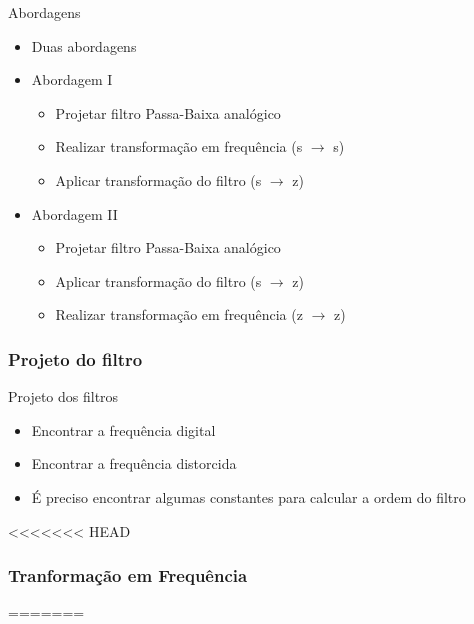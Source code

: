 \documentclass{beamer}
\begin{document}
	\begin{frame}{Abordagens}
		\begin{itemize}
			\item Duas abordagens
		\end{itemize}
		\begin{itemize}
			\item  Abordagem I
				\begin{itemize}
					\item Projetar filtro Passa-Baixa anal\'ogico
					\item Realizar transforma\c{c}\~ao em frequ\^encia (s \(\rightarrow\) s)
					\item Aplicar transforma\c{c}\~ao do filtro (s \(\rightarrow\) z)
				\end{itemize}
	\end{itemize}
		\begin{itemize}
			\item Abordagem II
				\begin{itemize}
					\item Projetar filtro Passa-Baixa anal\'ogico
					\item Aplicar transforma\c{c}\~ao do filtro (s \(\rightarrow\) z)
					\item Realizar transforma\c{c}\~ao em frequ\^encia (z \(\rightarrow\) z)
				\end{itemize}
		\end{itemize}
	\end{frame}

\subsubsection{Projeto do filtro}
	\begin{frame}{Projeto dos filtros}
		\begin{itemize}
		 \item Encontrar a frequ\^encia digital \omega
		\end{itemize}
		\begin{itemize}
		 \item Encontrar a frequ\^encia distorcida \Omega
		\end{itemize}
		\begin{itemize}
		 \item \'E preciso encontrar algumas constantes para calcular a ordem do filtro
		\end{itemize}
	\end{frame}
	
<<<<<<< HEAD
\subsubsection{Tranforma\c{c}\~ao em Frequ\^encia}
=======
\end{document}
